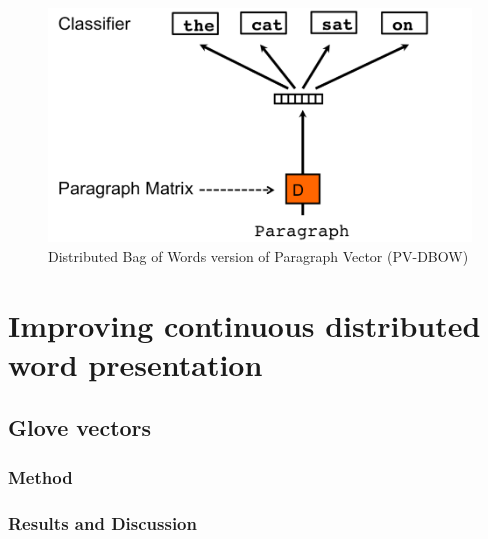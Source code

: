 \begin{figure}[H]
	\centering	\includegraphics[scale=0.3]{figure/para-vec-2}
	\caption{Distributed Bag of Words version of Paragraph Vector (PV-DBOW)\cite{ParagraphVec}}
	\label{fig:para-vec-2}
\end{figure}

\section{Improving continuous distributed word presentation}

\subsection{Glove vectors}
\subsubsection{Method}

\subsubsection{Results and Discussion}

